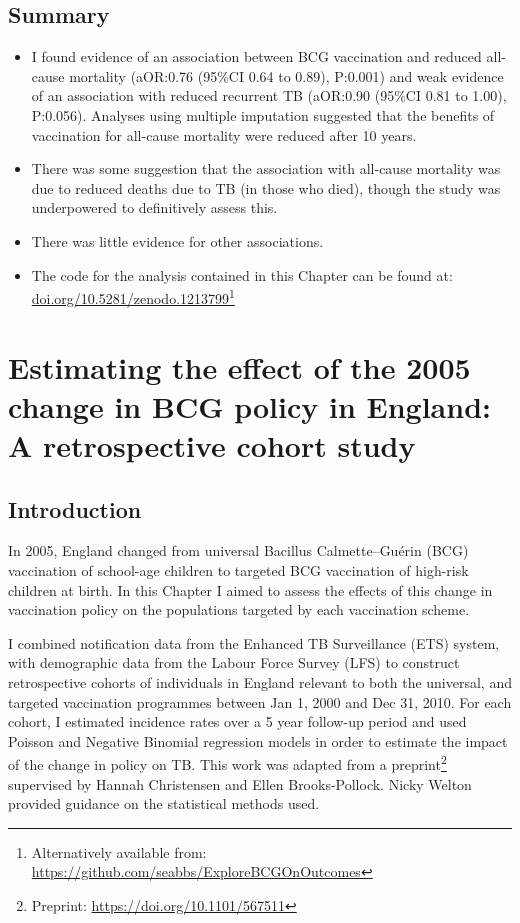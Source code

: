 \documentclass[11pt,twoside]{bristolthesis}
\begin{document}
  \hypertarget{summary-5}{%
  \section{Summary}\label{summary-5}}
  \begin{itemize}
  \item
    I found evidence of an association between BCG vaccination and reduced all-cause mortality (aOR:0.76 (95\%CI 0.64 to 0.89), P:0.001) and weak evidence of an association with reduced recurrent TB (aOR:0.90 (95\%CI 0.81 to 1.00), P:0.056). Analyses using multiple imputation suggested that the benefits of vaccination for all-cause mortality were reduced after 10 years.
  \item
    There was some suggestion that the association with all-cause mortality was due to reduced deaths due to TB (in those who died), though the study was underpowered to definitively assess this.
  \item
    There was little evidence for other associations.
  \item
    The code for the analysis contained in this Chapter can be found at: \url{doi.org/10.5281/zenodo.1213799}\footnote{Alternatively available from: \url{https://github.com/seabbs/ExploreBCGOnOutcomes}}
  \end{itemize}
  \hypertarget{direct-eff}{%
  \chapter{Estimating the effect of the 2005 change in BCG policy in England: A retrospective cohort study}\label{direct-eff}}
  
  \hypertarget{introduction-5}{%
  \section{Introduction}\label{introduction-5}}
  
  In 2005, England changed from universal Bacillus Calmette--Guérin (BCG) vaccination of school-age children to targeted BCG vaccination of high-risk children at birth. In this Chapter I aimed to assess the effects of this change in vaccination policy on the populations targeted by each vaccination scheme.
  
  I combined notification data from the Enhanced TB Surveillance (ETS) system, with demographic data from the Labour Force Survey (LFS) to construct retrospective cohorts of individuals in England relevant to both the universal, and targeted vaccination programmes between Jan 1, 2000 and Dec 31, 2010. For each cohort, I estimated incidence rates over a 5 year follow-up period and used Poisson and Negative Binomial regression models in order to estimate the impact of the change in policy on TB. This work was adapted from a preprint\footnote{Preprint: \url{https://doi.org/10.1101/567511}} supervised by Hannah Christensen and Ellen Brooks-Pollock. Nicky Welton provided guidance on the statistical methods used.
  
\end{document}
